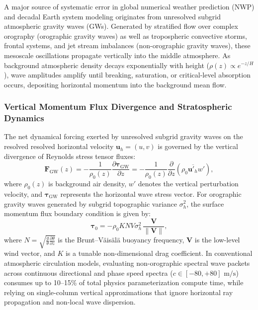 A major source of systematic error in global numerical weather prediction (NWP) and decadal Earth system modeling originates from unresolved subgrid atmospheric gravity waves (GWs). Generated by stratified flow over complex orography (orographic gravity waves) as well as tropospheric convective storms, frontal systems, and jet stream imbalances (non-orographic gravity waves), these mesoscale oscillations propagate vertically into the middle atmosphere. As background atmospheric density decays exponentially with height ($\rho(z) \propto e^{-z/H}$), wave amplitudes amplify until breaking, saturation, or critical-level absorption occurs, depositing horizontal momentum into the background mean flow.

\subsubsection{Vertical Momentum Flux Divergence and Stratospheric Dynamics}
The net dynamical forcing exerted by unresolved subgrid gravity waves on the resolved resolved horizontal velocity $\mathbf{u}_h = (u, v)$ is governed by the vertical divergence of Reynolds stress tensor fluxes:
\begin{equation}
    \mathbf{F}_{\text{GW}}(z) = -\frac{1}{\rho_0(z)} \frac{\partial \boldsymbol{\tau}_{\text{GW}}}{\partial z} = -\frac{1}{\rho_0(z)} \frac{\partial}{\partial z} \left( \overline{\rho_0 \mathbf{u}'_h w'} \right),
    \label{eq:gw_momentum_divergence}
\end{equation}
where $\rho_0(z)$ is background air density, $w'$ denotes the vertical perturbation velocity, and $\boldsymbol{\tau}_{\text{GW}}$ represents the horizontal wave stress vector. For orographic gravity waves generated by subgrid topographic variance $\sigma_h^2$, the surface momentum flux boundary condition is given by:
\begin{equation}
    \boldsymbol{\tau}_0 = -\rho_0 K N V \sigma_h^2 \, \frac{\mathbf{V}}{\|\mathbf{V}\|},
    \label{eq:orographic_flux_bc}
\end{equation}
where $N = \sqrt{\frac{g}{\theta}\frac{\partial \theta}{\partial z}}$ is the Brunt--V\"ais\"al\"a buoyancy frequency, $\mathbf{V}$ is the low-level wind vector, and $K$ is a tunable non-dimensional drag coefficient. In conventional atmospheric circulation models, evaluating non-orographic spectral wave packets across continuous directional and phase speed spectra ($c \in [-80, +80]\text{ m/s}$) consumes up to 10--15\% of total physics parameterization compute time, while relying on single-column vertical approximations that ignore horizontal ray propagation and non-local wave dispersion.

